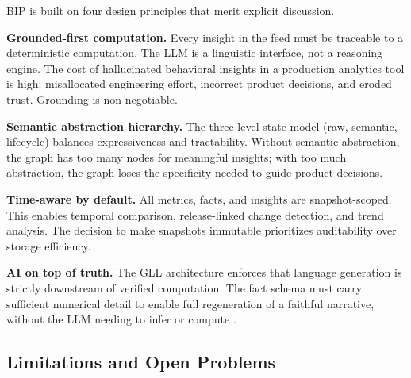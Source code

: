 \documentclass[12pt, a4paper]{article}
\begin{document}
BIP is built on four design principles that merit explicit discussion.

\textbf{Grounded-first computation.} Every insight in the feed must be traceable to a deterministic computation. The LLM is a linguistic interface, not a reasoning engine. The cost of hallucinated behavioral insights in a production analytics tool is high: misallocated engineering effort, incorrect product decisions, and eroded trust. Grounding is non-negotiable.

\textbf{Semantic abstraction hierarchy.} The three-level state model (raw, semantic, lifecycle) balances expressiveness and tractability. Without semantic abstraction, the graph has too many nodes for meaningful insights; with too much abstraction, the graph loses the specificity needed to guide product decisions.

\textbf{Time-aware by default.} All metrics, facts, and insights are snapshot-scoped. This enables temporal comparison, release-linked change detection, and trend analysis. The decision to make snapshots immutable prioritizes auditability over storage efficiency.

\textbf{AI on top of truth.} The GLL architecture enforces that language generation is strictly downstream of verified computation. The fact schema must carry sufficient numerical detail to enable full regeneration of a faithful narrative, without the LLM needing to infer or compute \cite{pan2024}.

\subsection{Limitations and Open Problems}
\end{document}
